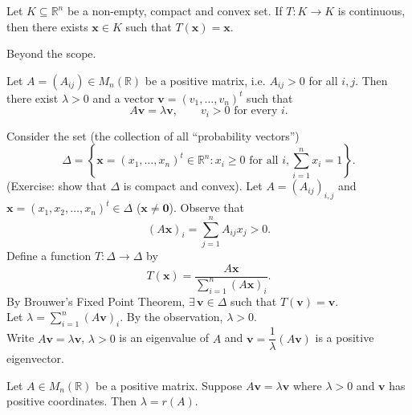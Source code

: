 \begin{thmbox}
Let $K\subseteq\mathbb{R}^n$ be a non-empty, compact and convex set. If $T:K\to K$ is continuous, then there exists $\mathbf{x}\in K$ such that $T(\mathbf{x})=\mathbf{x}$.
\end{thmbox}

\begin{pfbox}
    Beyond the scope.
\end{pfbox}

\begin{theorem}
\label{thm:positive-matrix-positive-eigenpair}
Let $A=(A_{ij})\in M_n(\mathbb{R})$ be a positive matrix, i.e. $A_{ij}>0$ for all $i,j$. Then there exist $\lambda>0$ and a vector $\mathbf{v}=(v_1,\dots,v_n)^t$ such that
\[
A\mathbf{v}=\lambda\mathbf{v},
\qquad
v_i>0
\text{ for every }i.
\]
\end{theorem}

\begin{pfbox}
Consider the set (the collection of all ``probability vectors'')
\[
\Delta
=
\left\{
\mathbf{x}=(x_1,\dots,x_n)^t\in\mathbb{R}^n:
 x_i\ge 0 \text{ for all } i,
 \sum_{i=1}^n x_i=1
\right\}.
\]
(Exercise: show that $\Delta$ is compact and convex). 
Let $A=(A_{ij})_{i,j}$ and $\mathbf{x}=(x_1,x_2,\dots,x_n)^t\in\Delta$ ($\mathbf{x}\neq\mathbf{0}$).
Observe that
\[
(A\mathbf{x})_i
=
\sum_{j=1}^n A_{ij}x_j
>
0.
\]
Define a function $T:\Delta\to\Delta$ by
\[
T(\mathbf{x})
=
\frac{A\mathbf{x}}{\displaystyle\sum_{i=1}^n (A\mathbf{x})_i}.
\]
By Brouwer's Fixed Point Theorem, $\exists\,\mathbf{v}\in\Delta$ such that $T(\mathbf{v})=\mathbf{v}$.\\
Let $\lambda=\displaystyle\sum_{i=1}^n (A\mathbf{v})_i$. By the observation, $\lambda>0$.\\
Write $A\mathbf{v}=\lambda\mathbf{v}$, $\lambda>0$ is an eigenvalue of $A$ and $\mathbf{v}=\dfrac{1}{\lambda}(A\mathbf{v})$ is a positive eigenvector.
\end{pfbox}

\begin{theorem}
\label{thm:positive-eigenpair-spectral-radius}
Let $A\in M_n(\mathbb{R})$ be a positive matrix. Suppose $A\mathbf{v}=\lambda\mathbf{v}$ where $\lambda>0$ and $\mathbf{v}$ has positive coordinates. Then $\lambda=r(A)$.
\end{theorem}


